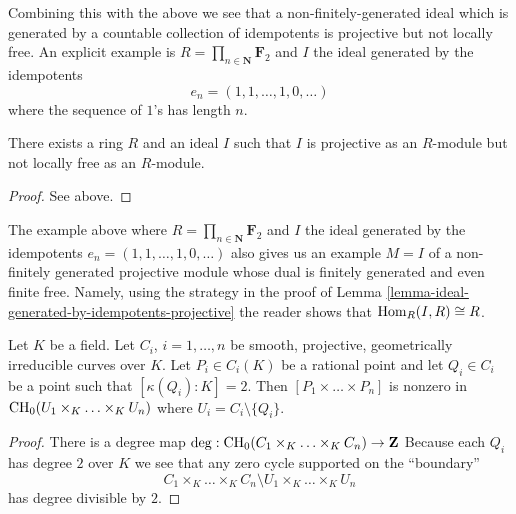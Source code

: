 \medskip\noindent
Combining this with the above we see that a non-finitely-generated
ideal which is generated by a countable collection of idempotents
is projective but not locally free. An explicit example is
$R = \prod_{n \in \mathbf{N}} \mathbf{F}_2$ and
$I$ the ideal generated by the idempotents
$$
e_n = (1, 1, \ldots, 1, 0, \ldots )
$$
where the sequence of $1$'s has length $n$.

\begin{lemma}
\label{lemma-ideal-projective-not-locally-free}
There exists a ring $R$ and an ideal $I$ such that $I$ is projective as
an $R$-module but not locally free as an $R$-module.
\end{lemma}

\begin{proof}
See above.
\end{proof}

\begin{remark}
\label{remark-projective-with-dual-finite-not-finite}
The example above where $R = \prod_{n \in \mathbf{N}} \mathbf{F}_2$ and
$I$ the ideal generated by the idempotents
$e_n = (1, 1, \ldots, 1, 0, \ldots )$ also gives us an example $M = I$
of a non-finitely generated projective module whose dual is finitely
generated and even finite free. Namely, using the strategy in the proof of
Lemma \ref{lemma-ideal-generated-by-idempotents-projective}
the reader shows that $\mathop{\mathrm{Hom}}\nolimits_R(I, R) \cong R$.
\end{remark}

\begin{lemma}
\label{lemma-chow-group-product}
Let $K$ be a field.
Let $C_i$, $i = 1, \ldots, n$ be smooth, projective, geometrically irreducible
curves over $K$. Let $P_i \in C_i(K)$ be a rational point and
let $Q_i \in C_i$ be a point such that $[\kappa(Q_i) : K] = 2$.
Then $[P_1 \times \ldots \times P_n]$ is nonzero in
$\mathop{\mathrm{CH}}\nolimits_0(U_1 \times_K \ldots \times_K U_n)$ where $U_i = C_i \setminus \{Q_i\}$.
\end{lemma}

\begin{proof}
There is a degree map
$\deg : \mathop{\mathrm{CH}}\nolimits_0(C_1 \times_K \ldots \times_K C_n) \to \mathbf{Z}$
Because each $Q_i$ has degree $2$ over $K$ we see that
any zero cycle supported on the ``boundary''
$$
C_1 \times_K \ldots \times_K C_n
\setminus
U_1 \times_K \ldots \times_K U_n
$$
has degree divisible by $2$.
\end{proof}

